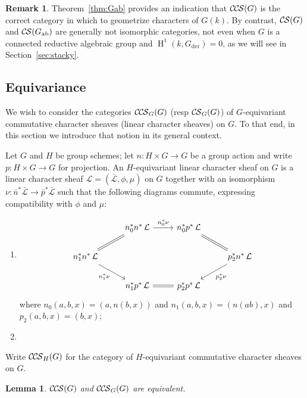 \documentclass[10pt]{amsart}
\theoremstyle{plain}
\newtheorem{proposition}[theorem]{Proposition}
\newtheorem{lemma}[theorem]{Lemma}
\theoremstyle{definition}
\newtheorem{remark}[theorem]{Remark}
\newcommand{\Fq}{k}
\DeclareMathOperator{\Hh}{H}
\newcommand{\der}{_{\operatorname{der}}}
\newcommand{\ab}{_{\operatorname{ab}}}
\newcommand{\cs}[1]{{\mathcal{#1}}}
\newcommand{\gcs}[1]{{\mathcal{\bar #1}}}
\newcommand{\CS}{{\mathcal{C\hskip-0.8pt S}}}
\newcommand{\CCS}{{\mathcal{C\hskip-.8pt C\hskip-0.8pt S}}}
\begin{document}
\begin{remark}
Theorem~\ref{thm:Gab} provides an indication that $\CCS(G)$ is the correct category in which to geometrize characters of $G(\Fq)$. 
By contrast, $\CS(G)$ and $\CS(G\ab)$ are generally not isomorphic categories, not even when $G$ is a connected reductive algebraic group and $\Hh^1(\Fq,G\der)=0$, as we will see in Section~\ref{sec:stacky}.
\end{remark}

\subsection{Equivariance}

We wish to consider the categories $\CCS_G(G)$ (resp $\CS_G(G)$) of $G$-equivariant commutative character sheaves (linear character sheaves) on $G$. To that end, in this section we introduce that notion in its general context.

Let $G$ and $H$ be group schemes; let $n : H \times G\to G$ be a group action and write $p : H\times G \to G$ for projection. 
An $H$-equivariant linear character sheaf on $G$ is a linear character sheaf $\cs{L} = (\gcs{L},\phi,\mu)$ on $G$ together with an isomorphism  $\nu : {\bar n}^*\gcs{L} \to {\bar p}^*\gcs{L}$ such that the following diagrams commute, expressing compatibility with $\phi$ and $\mu$:
\begin{enumerate}
\item
\[
\begin{tikzcd}
\ &  n_0^*  n^*\, \mathcal{L} \arrow{r}{n_0^*\nu} & n_0^* p^*\, \mathcal{L} & \\
n_1^* n^*\, \mathcal{L} \arrow{dr}[swap]{n_1^*\nu} \arrow[equal]{ur} &&& \arrow[equal]{ul}  \arrow{dl}{p_2^*\nu} p_2^* n^*\, \mathcal{L} \\
& n_1^* p^*\, \mathcal{L} \arrow[equal]{r} & p_2^* p^*\, \mathcal{L} & 
\end{tikzcd}
\]
where $n_0(a,b,x) = (a,n(b,x))$ and $n_1(a,b,x) = (n(ab),x)$ and $p_2(a,b,x) = (b,x)$;
\item
\end{enumerate}
Write $\CCS_H(G)$ for the category of $H$-equivariant commutative character sheaves on $G$.

\begin{lemma}\label{lem:equivariant}
$\CCS(G)$ and $\CCS_G(G)$ are equivalent.
\end{lemma}
\end{document}
